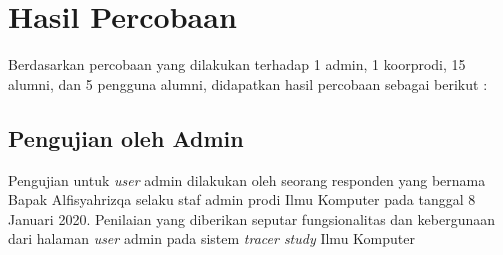 \section{Hasil Percobaan}
Berdasarkan percobaan yang dilakukan terhadap 1 admin, 1 koorprodi, 15 alumni, dan 5 pengguna alumni, didapatkan hasil percobaan sebagai berikut :

\subsection{Pengujian oleh Admin}
Pengujian untuk \textit{user} admin dilakukan oleh seorang responden yang bernama Bapak Alfisyahrizqa selaku staf admin prodi Ilmu Komputer pada tanggal 8 Januari 2020. Penilaian yang diberikan seputar fungsionalitas dan kebergunaan dari halaman \textit{user} admin pada sistem \textit{tracer study} Ilmu Komputer

